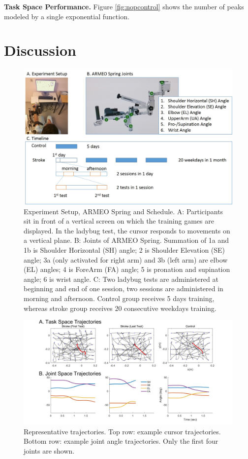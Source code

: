 \textbf{Task Space Performance.}
Figure \ref{fig:nopcontrol} shows the number of peaks modeled by a single exponential function.

\section{Discussion}



\begin{figure}
	\centering
	\includegraphics[width=1\linewidth]{figures/1setup&schedule}
	\caption[Experiment Setup and Schedule]
	{Experiment Setup, ARMEO Spring and Schedule. 
		A: Participants sit in front of a vertical screen on which the training games are displayed. In the ladybug test, the cursor responds to movements on a vertical plane. 
		B: Joints of ARMEO Spring. Summation of 1a and 1b is Shoulder Horizontal (SH) angle; 2 is Shoulder Elevation (SE) angle; 3a (only activated for right arm) and 3b (left arm) are elbow (EL) angles; 4 is ForeArm (FA) angle; 5 is pronation and supination angle; 6 is wrist angle.
		C: Two ladybug tests are administered at beginning and end of one session, two sessions are administered in morning and afternoon. Control group receives 5 days training, whereas stroke group receives 20 consecutive weekdays training.}
	\label{fig:1setupschedule}
\end{figure}

\begin{figure}
	\centering
	\includegraphics[width=1\linewidth]{figures/2strokeTrajExamp}
	\caption[Example trajectories]
	{Representative trajectories. 
		Top row: example cursor trajectories.
		Bottom row: example joint angle trajectories. Only the first four joints are shown.}
	\label{fig:2stroketrajexamp}
\end{figure}


